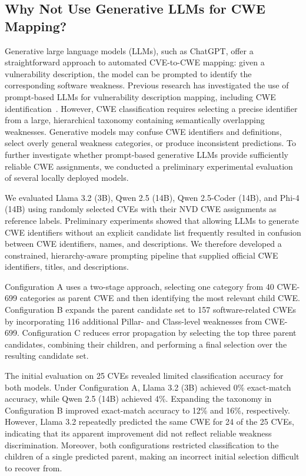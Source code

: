 \documentclass[conference,compsoc]{IEEEtran}
\begin{document}
\subsection{Why Not Use Generative LLMs for CWE Mapping?}
\label{subsec:generative_llm_limitations}


Generative large language models (LLMs), such as ChatGPT,
offer a straightforward approach to automated CVE-to-CWE
mapping: given a vulnerability description, the model
can be prompted to identify the corresponding software
weakness. Previous research has investigated the use of
prompt-based LLMs for vulnerability description mapping,
including CWE identification~\cite{liu2023not}.
However, CWE classification requires selecting a precise
identifier from a large, hierarchical taxonomy containing
semantically overlapping weaknesses. Generative models
may confuse CWE identifiers and definitions, select
overly general weakness categories, or produce
inconsistent predictions. To further investigate whether
prompt-based generative LLMs provide sufficiently reliable
CWE assignments, we conducted a preliminary experimental
evaluation of several locally deployed models.


We evaluated Llama 3.2 (3B), Qwen 2.5 (14B),
Qwen 2.5-Coder (14B), and Phi-4 (14B) using randomly selected CVEs with their NVD CWE assignments
as reference labels. Preliminary experiments showed
that allowing LLMs to generate CWE identifiers
without an explicit candidate list frequently
resulted in confusion between CWE identifiers,
names, and descriptions. We therefore developed
a constrained, hierarchy-aware prompting pipeline
that supplied official CWE identifiers, titles,
and descriptions. 

Configuration A uses a two-stage approach, selecting one
category from 40 CWE-699 categories as parent CWE and then identifying
the most relevant child CWE. Configuration B expands
the parent candidate set to 157 software-related CWEs
by incorporating 116 additional Pillar- and Class-level
weaknesses from CWE-699. Configuration C reduces error
propagation by selecting the top three parent candidates,
combining their children, and performing a final selection
over the resulting candidate set.



The initial evaluation on 25 CVEs revealed limited
classification accuracy for both models. Under
Configuration A, Llama 3.2 (3B) achieved 0\%
exact-match accuracy, while Qwen 2.5 (14B) achieved
4\%. Expanding the taxonomy in Configuration B
improved exact-match accuracy to 12\% and 16\%,
respectively. However, Llama 3.2 repeatedly predicted
the same CWE for 24 of the 25 CVEs, indicating that
its apparent improvement did not reflect reliable
weakness discrimination. Moreover, both configurations
restricted classification to the children of a single
predicted parent, making an incorrect initial selection
difficult to recover from.
\end{document}
